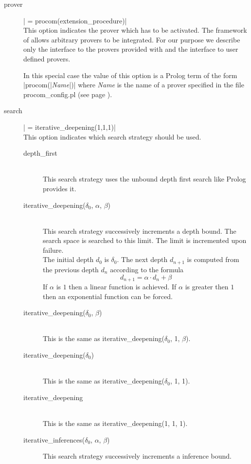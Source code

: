 \begin{description}
  \item [prover] | = procom(extension_procedure)|\label{opt:prover}\\
	This option indicates the prover which has to be activated. The
	framework of \ProCom{} allows arbitrary provers to be integrated. For
	our purpose we describe only the interface to the provers provided
	with \ProCom{} and the interface to user defined provers.
	
	In this special case the value of this option is a Prolog term
	of the form |procom(|{\em Name}|)| where {\em Name}\/ is the
	name of a prover specified in the file {\sf procom\_config.pl}
	(see page \pageref{procom.config}).

  \item [search] | = iterative_deepening(1,1,1)|\\
	This option indicates which search strategy should be used.
	\begin{description}
	  \item [depth\_first]\ \\
		This search strategy uses the unbound depth first search like
		Prolog provides it.
	  \item [iterative\_deepening($\delta_0$, $\alpha$, $\beta$)]\ \\
		This search strategy successively increments a depth bound.
		The search space is searched to this limit. The limit is
		incremented upon failure.
		\\
		The initial depth $d_0$\/ is $\delta_0$.
		The next depth $d_{n+1}$\/ is computed from the previous depth
		$d_n$\/ according to the formula
		\[ d_{n+1} = \alpha\cdot d_n + \beta
		\]
		If $\alpha$\/ is $1$\/ then a linear function is achieved. If
		$\alpha$\/ is greater then $1$\/ then an exponential function
		can be forced.
	  \item [iterative\_deepening($\delta_0$, $\beta$)]\ \\
	        This is the same as 
		iterative\_deepening($\delta_0$, 1, $\beta$).
	  \item [iterative\_deepening($\delta_0$)]\ \\
	        This is the same as iterative\_deepening($\delta_0$, 1, 1).
	  \item [iterative\_deepening]\ \\
	        This is the same as iterative\_deepening(1, 1, 1).
	  \item [iterative\_inferences($\delta_0$, $\alpha$, $\beta$)]
	        This search strategy successively increments a inference bound.

\end{description}
\end{description}
